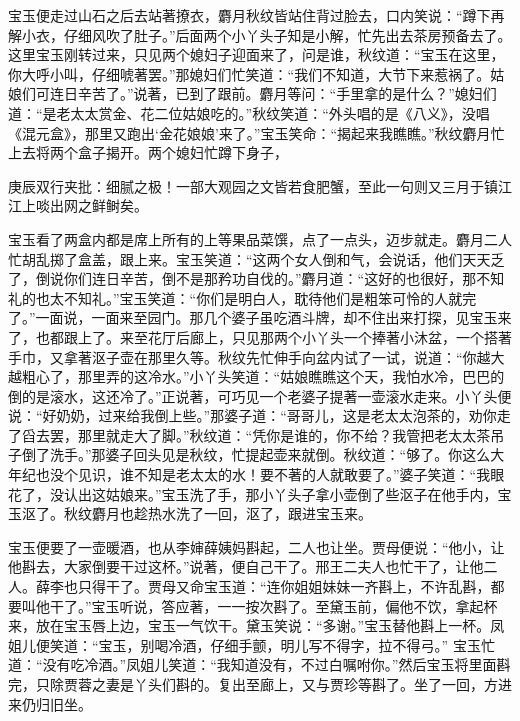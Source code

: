 \begin{parag}
    宝玉便走过山石之后去站著撩衣，麝月秋纹皆站住背过脸去，口内笑说：“蹲下再解小衣，仔细风吹了肚子。”后面两个小丫头子知是小解，忙先出去茶房预备去了。这里宝玉刚转过来，只见两个媳妇子迎面来了，问是谁，秋纹道：“宝玉在这里，你大呼小叫，仔细唬著罢。”那媳妇们忙笑道：“我们不知道，大节下来惹祸了。姑娘们可连日辛苦了。”说著，已到了跟前。麝月等问：“手里拿的是什么？”媳妇们道：“是老太太赏金、花二位姑娘吃的。”秋纹笑道：“外头唱的是《八义》，没唱《混元盒》，那里又跑出‘金花娘娘’来了。”宝玉笑命：“揭起来我瞧瞧。”秋纹麝月忙上去将两个盒子揭开。两个媳妇忙蹲下身子，\begin{note}庚辰双行夹批：细腻之极！一部大观园之文皆若食肥蟹，至此一句则又三月于镇江江上啖出网之鲜鲥矣。\end{note}宝玉看了两盒内都是席上所有的上等果品菜馔，点了一点头，迈步就走。麝月二人忙胡乱掷了盒盖，跟上来。宝玉笑道：“这两个女人倒和气，会说话，他们天天乏了，倒说你们连日辛苦，倒不是那矜功自伐的。”麝月道：“这好的也很好，那不知礼的也太不知礼。”宝玉笑道：“你们是明白人，耽待他们是粗笨可怜的人就完了。”一面说，一面来至园门。那几个婆子虽吃酒斗牌，却不住出来打探，见宝玉来了，也都跟上了。来至花厅后廊上，只见那两个小丫头一个捧著小沐盆，一个搭著手巾，又拿著沤子壶在那里久等。秋纹先忙伸手向盆内试了一试，说道：“你越大越粗心了，那里弄的这冷水。”小丫头笑道：“姑娘瞧瞧这个天，我怕水冷，巴巴的倒的是滚水，这还冷了。”正说著，可巧见一个老婆子提著一壶滚水走来。小丫头便说：“好奶奶，过来给我倒上些。”那婆子道：“哥哥儿，这是老太太泡茶的，劝你走了舀去罢，那里就走大了脚。”秋纹道：“凭你是谁的，你不给？我管把老太太茶吊子倒了洗手。”那婆子回头见是秋纹，忙提起壶来就倒。秋纹道：“够了。你这么大年纪也没个见识，谁不知是老太太的水！要不著的人就敢要了。”婆子笑道：“我眼花了，没认出这姑娘来。”宝玉洗了手，那小丫头子拿小壶倒了些沤子在他手内，宝玉沤了。秋纹麝月也趁热水洗了一回，沤了，跟进宝玉来。
\end{parag}


\begin{parag}
    宝玉便要了一壶暖酒，也从李婶薛姨妈斟起，二人也让坐。贾母便说：“他小，让他斟去，大家倒要干过这杯。”说著，便自己干了。邢王二夫人也忙干了，让他二人。薛李也只得干了。贾母又命宝玉道：“连你姐姐妹妹一齐斟上，不许乱斟，都要叫他干了。”宝玉听说，答应著，一一按次斟了。至黛玉前，偏他不饮，拿起杯来，放在宝玉唇上边，宝玉一气饮干。黛玉笑说：“多谢。”宝玉替他斟上一杯。凤姐儿便笑道：“宝玉，别喝冷酒，仔细手颤，明儿写不得字，拉不得弓。” 宝玉忙道：“没有吃冷酒。”凤姐儿笑道：“我知道没有，不过白嘱咐你。”然后宝玉将里面斟完，只除贾蓉之妻是丫头们斟的。复出至廊上，又与贾珍等斟了。坐了一回，方进来仍归旧坐。
\end{parag}


